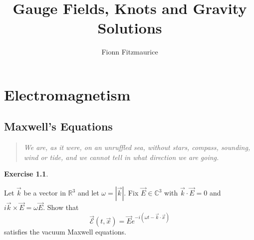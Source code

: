 \documentclass[11pt, a4paper]{report}
\title{Gauge Fields, Knots and Gravity Solutions}
\author{Fionn Fitzmaurice \hspace{2em} \https{fionn.github.io/gfkg}}
\date{}
\theoremstyle{definition}
\newtheorem{exercise}{Exercise}[part]
\newenvironment{ex}{\begin{exercise}}{\end{exercise}\pagebreak[1]}
\newenvironment{epigraph}
    {\begin{quote}\small\itshape} %
    {\end{quote}\ignorespacesafterend\vspace{\parskip}}
\begin{document}
\thispagestyle{empty}

\maketitle

\vspace{-20ex}

\tableofcontents

\thispagestyle{empty}

\clearpage


\part{Electromagnetism}\label{part:electromagnetism}

\chapter{Maxwell's Equations}

\begin{epigraph}
    We are, as it were, on an unruffled sea, without stars, compass, sounding, wind or tide,
    and we cannot tell in what direction we are going.
\end{epigraph}

\begin{ex}\label{ex:i1}

Let $\vec{k}$ be a vector in $\mathbb{R}^3$ and let $\omega = |\vec{k}|$. Fix $\vec{E} \in \mathbb{C}^3$ with $\vec{k} \cdot \vec{E} = 0$ and $i \vec{k} \times \vec{E} = \omega \vec{E}$. Show that
\[
    \vec{\mathcal{E}}(t, \vec{x}) = \vec{E} e^{-i(\omega t - \vec{k} \cdot \vec{x})}
\]
satisfies the vacuum Maxwell equations.

\end{ex}
\end{document}
